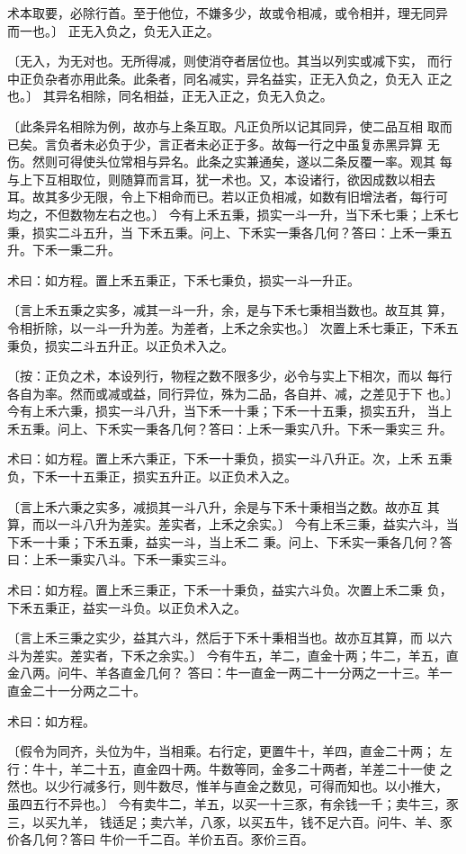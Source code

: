 \documentclass[a4paper,12pt,UTF8,twoside]{ctexbook}
\begin{document}
术本取要，必除行首。至于他位，不嫌多少，故或令相减，或令相并，理无同异 而一也。〕 正无入负之，负无入正之。

〔无入，为无对也。无所得减，则使消夺者居位也。其当以列实或减下实， 而行中正负杂者亦用此条。此条者，同名减实，异名益实，正无入负之，负无入 正之也。〕 其异名相除，同名相益，正无入正之，负无入负之。

〔此条异名相除为例，故亦与上条互取。凡正负所以记其同异，使二品互相 取而已矣。言负者未必负于少，言正者未必正于多。故每一行之中虽复赤黑异算 无伤。然则可得使头位常相与异名。此条之实兼通矣，遂以二条反覆一率。观其 每与上下互相取位，则随算而言耳，犹一术也。又，本设诸行，欲因成数以相去 耳。故其多少无限，令上下相命而已。若以正负相减，如数有旧增法者，每行可 均之，不但数物左右之也。〕 今有上禾五秉，损实一斗一升，当下禾七秉；上禾七秉，损实二斗五升，当 下禾五秉。问上、下禾实一秉各几何？答曰：上禾一秉五升。下禾一秉二升。

术曰：如方程。置上禾五秉正，下禾七秉负，损实一斗一升正。

〔言上禾五秉之实多，减其一斗一升，余，是与下禾七秉相当数也。故互其 算，令相折除，以一斗一升为差。为差者，上禾之余实也。〕 次置上禾七秉正，下禾五秉负，损实二斗五升正。以正负术入之。

〔按：正负之术，本设列行，物程之数不限多少，必令与实上下相次，而以 每行各自为率。然而或减或益，同行异位，殊为二品，各自并、减，之差见于下 也。〕 今有上禾六秉，损实一斗八升，当下禾一十秉；下禾一十五秉，损实五升， 当上禾五秉。问上、下禾实一秉各几何？答曰：上禾一秉实八升。下禾一秉实三 升。

术曰：如方程。置上禾六秉正，下禾一十秉负，损实一斗八升正。次，上禾 五秉负，下禾一十五秉正，损实五升正。以正负术入之。

〔言上禾六秉之实多，减损其一斗八升，余是与下禾十秉相当之数。故亦互 其算，而以一斗八升为差实。差实者，上禾之余实。〕 今有上禾三秉，益实六斗，当下禾一十秉；下禾五秉，益实一斗，当上禾二 秉。问上、下禾实一秉各几何？答曰：上禾一秉实八斗。下禾一秉实三斗。

术曰：如方程。置上禾三秉正，下禾一十秉负，益实六斗负。次置上禾二秉 负，下禾五秉正，益实一斗负。以正负术入之。

〔言上禾三秉之实少，益其六斗，然后于下禾十秉相当也。故亦互其算，而 以六斗为差实。差实者，下禾之余实。〕 今有牛五，羊二，直金十两；牛二，羊五，直金八两。问牛、羊各直金几何？ 答曰：牛一直金一两二十一分两之一十三。羊一直金二十一分两之二十。

术曰：如方程。

〔假令为同齐，头位为牛，当相乘。右行定，更置牛十，羊四，直金二十两； 左行：牛十，羊二十五，直金四十两。牛数等同，金多二十两者，羊差二十一使 之然也。以少行减多行，则牛数尽，惟羊与直金之数见，可得而知也。以小推大， 虽四五行不异也。〕 今有卖牛二，羊五，以买一十三豕，有余钱一千；卖牛三，豕三，以买九羊， 钱适足；卖六羊，八豕，以买五牛，钱不足六百。问牛、羊、豕价各几何？答曰 牛价一千二百。羊价五百。豕价三百。
\end{document}
